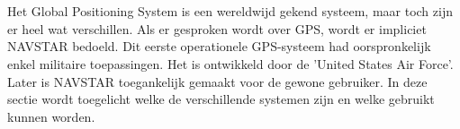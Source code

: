 \chapter{}
\label{ch:stand-van-zaken}


\section{}
Het Global Positioning System is een wereldwijd gekend systeem, maar toch zijn er heel wat verschillen. Als er gesproken wordt over GPS, wordt er impliciet NAVSTAR bedoeld.\autocite{gps} Dit eerste operationele GPS-systeem had oorspronkelijk enkel militaire toepassingen. Het is ontwikkeld door de 'United States Air Force'. \autocite{gnss}  Later is NAVSTAR toegankelijk gemaakt voor de gewone gebruiker. In deze sectie wordt toegelicht welke de verschillende systemen zijn en welke gebruikt kunnen worden.


